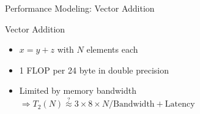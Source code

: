



\begin{frame}{Performance Modeling: Vector Addition}

 \begin{block}{Vector Addition}
  \begin{itemize}
   \item $x = y + z$ with $N$ elements each
   \item 1 FLOP per 24 byte in double precision
   \item Limited by memory bandwidth $\Rightarrow T_2(N) \stackrel{?}{\approx} 3 \times 8 \times N / \mathrm{Bandwidth} + \mathrm{Latency}$
  \end{itemize}
 \end{block}

 \vspace*{-0.5cm}
 \begin{center}
  
 \end{center}
 
 \end{frame}



